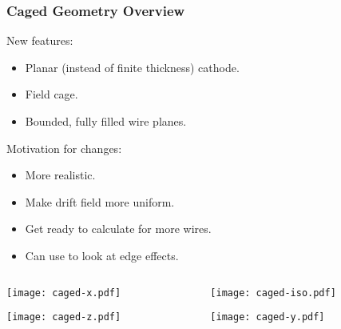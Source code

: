 \documentclass[xcolor=dvipsnames]{beamer}
\begin{document}


\begin{frame}
  \frametitle{Caged Geometry Overview}

  New features:
  \begin{itemize}
  \item Planar (instead of finite thickness) cathode.
  \item Field cage.
  \item Bounded, fully filled wire planes.
  \end{itemize}

  Motivation for changes:
  \begin{itemize}
  \item More realistic.
  \item Make drift field more uniform.
  \item Get ready to calculate for more wires.
  \item Can use to look at edge effects.
  \end{itemize}
\end{frame}

\begin{frame}
  \begin{columns}
    \begin{column}{0.5\textwidth}
      \texttt{[image: caged-x.pdf]}

      \texttt{[image: caged-z.pdf]}
    \end{column}
    \begin{column}{0.5\textwidth}
      \texttt{[image: caged-iso.pdf]}

      \texttt{[image: caged-y.pdf]}
    \end{column}
  \end{columns}
\end{frame}
\end{document}
